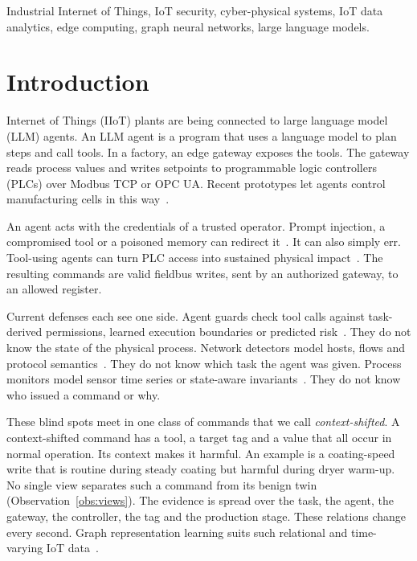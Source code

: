 \documentclass[journal]{IEEEtran}
\begin{document}
\begin{IEEEkeywords}
Industrial Internet of Things, IoT security, cyber-physical systems, IoT data analytics, edge computing, graph neural networks, large language models.
\end{IEEEkeywords}

\section{Introduction}
 Internet of Things (IIoT) plants are being connected to large language model (LLM) agents. An LLM agent is a program that uses a language model to plan steps and call tools. In a factory, an edge gateway exposes the tools. The gateway reads process values and writes setpoints to programmable logic controllers (PLCs) over Modbus TCP or OPC UA. Recent prototypes let agents control manufacturing cells in this way~\cite{xia2025control,vyas2025autonomous,hornyak2026plc,nogueira2026arc}.

An agent acts with the credentials of a trusted operator. Prompt injection, a compromised tool or a poisoned memory can redirect it~\cite{shahid2026copilots}. It can also simply err. Tool-using agents can turn PLC access into sustained physical impact~\cite{zhou2026plcbench}. The resulting commands are valid fieldbus writes, sent by an authorized gateway, to an allowed register.

Current defenses each see one side. Agent guards check tool calls against task-derived permissions, learned execution boundaries or predicted risk~\cite{qin2026airguard,sequeira2026agentsentry,wang2025probguard,he2026attriguard}. They do not know the state of the physical process. Network detectors model hosts, flows and protocol semantics~\cite{lo2022egraphsage,kong2025grid,malladi2026protocol}. They do not know which task the agent was given. Process monitors model sensor time series or state-aware invariants~\cite{deng2021gdn,abbas2024sain}. They do not know who issued a command or why.

These blind spots meet in one class of commands that we call \emph{context-shifted}. A context-shifted command has a tool, a target tag and a value that all occur in normal operation. Its context makes it harmful. An example is a coating-speed write that is routine during steady coating but harmful during dryer warm-up. No single view separates such a command from its benign twin (Observation~\ref{obs:views}). The evidence is spread over the task, the agent, the gateway, the controller, the tag and the production stage. These relations change every second. Graph representation learning suits such relational and time-varying IoT data~\cite{dong2022gnniot,moorthy2025survey}.
\end{document}
